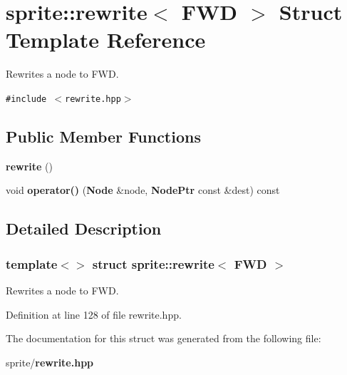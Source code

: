 \section{sprite::rewrite$<$ FWD $>$ Struct Template Reference}
\label{structsprite_1_1rewrite_3_01FWD_01_4}
Rewrites a node to FWD.  


{\tt \#include $<$rewrite.hpp$>$}

\subsection*{Public Member Functions}
\begin{CompactItemize}
\item 
{\bf rewrite} ()\label{structsprite_1_1rewrite_3_01FWD_01_4_a0}

\item 
void {\bf operator()} ({\bf Node} \&node, {\bf Node\-Ptr} const \&dest) const \label{structsprite_1_1rewrite_3_01FWD_01_4_a1}

\end{CompactItemize}


\subsection{Detailed Description}
\subsubsection*{template$<$$>$ struct sprite::rewrite$<$ FWD $>$}

Rewrites a node to FWD. 



Definition at line 128 of file rewrite.hpp.

The documentation for this struct was generated from the following file:\begin{CompactItemize}
\item 
sprite/{\bf rewrite.hpp}\end{CompactItemize}
